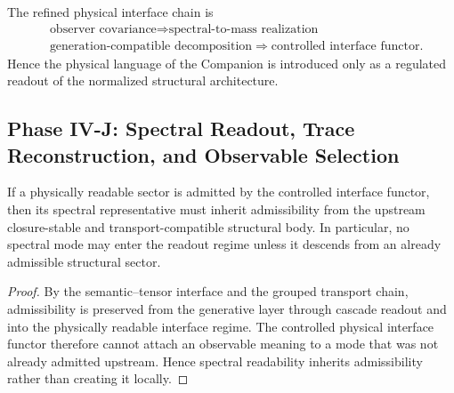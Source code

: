 \begin{corollary}
\label{cor:refined-physical-interface-chain}
The refined physical interface chain is
\[
\begin{aligned}
&\text{observer covariance}
  \Longrightarrow \text{spectral-to-mass realization}\\
&\text{generation-compatible decomposition}
  \Longrightarrow \text{controlled interface functor}.
\end{aligned}
\]
Hence the physical language of the Companion is introduced only as a regulated readout of the normalized structural architecture.
\end{corollary}








\subsection*{Phase IV-J: Spectral Readout, Trace Reconstruction, and Observable Selection}

\begin{lemma}
\label{lem:spectral-admissibility-inheritance}
If a physically readable sector is admitted by the controlled interface functor, then its spectral representative must inherit admissibility from the upstream closure-stable and transport-compatible structural body. In particular, no spectral mode may enter the readout regime unless it descends from an already admissible structural sector.
\end{lemma}

\begin{proof}
By the semantic--tensor interface and the grouped transport chain, admissibility is preserved from the generative layer through cascade readout and into the physically readable interface regime. The controlled physical interface functor therefore cannot attach an observable meaning to a mode that was not already admitted upstream. Hence spectral readability inherits admissibility rather than creating it locally.
\end{proof}

